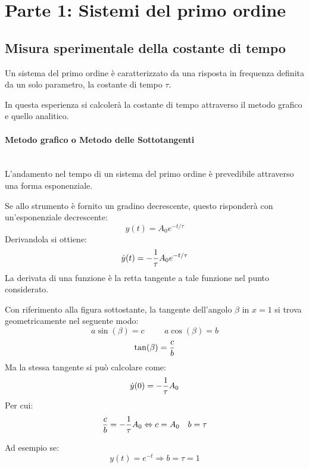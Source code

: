 \documentclass[a4paper, 12pt, twoside]{report}
\begin{document}
		
		\section{Parte 1: Sistemi del primo ordine} 
		\subsection{Misura sperimentale della costante di tempo}
		Un sistema del primo ordine è caratterizzato da una risposta in frequenza definita da un solo parametro, la costante di tempo $\tau$. \newline
		
		In questa esperienza si calcolerà la costante di tempo attraverso il metodo grafico e quello analitico.  
		
		\paragraph{Metodo grafico o Metodo delle Sottotangenti} \mbox{} \\ 
		L'andamento nel tempo di un sistema del primo ordine è prevedibile attraverso una forma esponenziale.
		
		Se allo strumento è fornito un gradino decrescente, questo risponderà con un'esponenziale decrescente:
		\[y(t) = A_0e^{-t/\tau}\]
		Derivandola si ottiene:
		\[\dot{y}(t) = -{1\over\tau}A_0e^{-t/\tau}\]
		La derivata di una funzione è la retta tangente a tale funzione nel punto considerato.
		 
		Con riferimento alla figura sottostante, la tangente dell’angolo $\beta$ in $ x = 1 $ si trova geometricamente nel
		seguente modo:
 		\[a\sin(\beta) = c \hspace{1cm} a\cos(\beta) = b\]
		\[\tan(\beta) = {c\over b}\]
		Ma la stessa tangente si può calcolare come:
		\[ \dot{y}(0) = -{1\over\tau}A_0 \]
		Per cui: 
		\[{c\over b} = -{1\over\tau}A_0 \Leftrightarrow c=A_0\quad b = \tau \]
		
		Ad esempio se:
		\[y(t) = e^{-t} \Rightarrow b = \tau = 1\]
					
\end{document}
